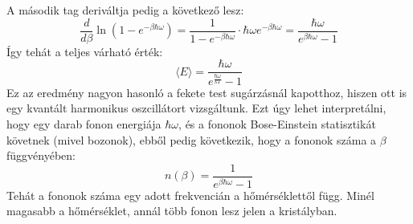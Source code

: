 \documentclass[../main.tex]{subfiles}
\begin{document}
A második tag deriváltja pedig a következő lesz:
\begin{equation}
    \frac{d}{d \beta} \ln \left(1 - e^{-\beta \hbar \omega}\right) = \frac{1}{1 - e^{-\beta \hbar \omega}} \cdot \hbar \omega e^{-\beta \hbar \omega} = \frac{\hbar \omega}{e^{\beta \hbar \omega} - 1}
\end{equation}
Így tehát a teljes várható érték:
\begin{equation}
    \boxed{\langle E \rangle = \frac{\hbar \omega}{e^{\frac{\hbar \omega}{k T}} - 1}}
\end{equation}
Ez az eredmény nagyon hasonló a fekete test sugárzásnál kapotthoz, hiszen ott is egy kvantált harmonikus oszcillátort vizsgáltunk. Ezt úgy lehet interpretálni, hogy egy darab fonon energiája $\hbar \omega$, és a fononok Bose-Einstein statisztikát követnek (mivel bozonok), 
ebből pedig következik, hogy a fononok száma a $\beta$ függvényében:
\begin{equation}
    n(\beta) = \frac{1}{e^{\beta \hbar \omega} - 1}
\end{equation}
Tehát a fononok száma egy adott frekvencián a hőmérséklettől függ. Minél magasabb a hőmérséklet, annál több fonon lesz jelen a kristályban. 
\end{document}
